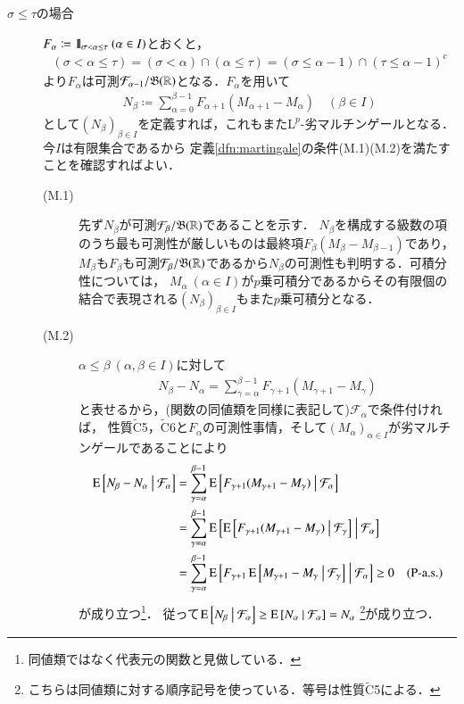 	\begin{prf}\mbox{}
		\begin{description}
			\item[$\sigma \leq \tau$の場合]
				$F_\alpha \coloneqq \mbox{1}\hspace{-0.25em}\mbox{l}_{\sigma < \alpha \leq \tau}\ (\alpha \in I)$とおくと，
				\begin{align}
					(\sigma < \alpha \leq \tau) = (\sigma < \alpha) \cap (\alpha \leq \tau) = (\sigma \leq \alpha-1) \cap (\tau \leq \alpha-1)^c
				\end{align}
				より$F_\alpha$は可測$\mathcal{F}_{\alpha-1}/\mathfrak{B}(\mathbb{R})$となる．$F_\alpha$を用いて
				\begin{align}
					N_\beta \coloneqq \sum_{\alpha=0}^{\beta-1} F_{\alpha+1}(M_{\alpha+1} - M_\alpha) \quad (\beta \in I)
				\end{align}
				として$(N_\beta)_{\beta \in I}$を定義すれば，これもまた$\mathrm{L}^p$-劣マルチンゲールとなる．今$I$は有限集合であるから
				定義\ref{dfn:martingale}の条件(M.1)(M.2)を満たすことを確認すればよい．
				\begin{description}
					\item[(M.1)] 先ず$N_\beta$が可測$\mathcal{F}_\beta/\mathfrak{B}(\mathbb{R})$であることを示す．
						$N_\beta$を構成する級数の項のうち最も可測性が厳しいものは最終項$F_{\beta}(M_{\beta} - M_{\beta-1})$であり，
						$M_\beta$も$F_{\beta}$も可測$\mathcal{F}_\beta/\mathfrak{B}(\mathbb{R})$であるから$N_\beta$の可測性も判明する．可積分性については，
						$M_\alpha\ (\alpha \in I)$が$p$乗可積分であるからその有限個の結合で表現される$(N_\beta)_{\beta \in I}$もまた$p$乗可積分となる．
					\item[(M.2)]	
						$\alpha \leq \beta\ (\alpha,\beta \in I)$に対して
						\begin{align}
							N_{\beta} - N_{\alpha} = \sum_{\gamma=\alpha}^{\beta-1} F_{\gamma+1}(M_{\gamma+1} - M_\gamma)
						\end{align}
						と表せるから，(関数の同値類を同様に表記して)$\mathcal{F}_{\alpha}$で条件付ければ，
						性質$\tilde{\mathrm{C}}$5，$\tilde{\mathrm{C}}$6と$F_\alpha$の可測性事情，そして$(M_\alpha)_{\alpha \in I}$が劣マルチンゲールであることにより
						\begin{align}
							\operatorname{E} \left[ N_{\beta} - N_{\alpha} \ \middle|\ \mathcal{F}_\alpha \right]
							&= \sum_{\gamma=\alpha}^{\beta-1} \operatorname{E} \left[ F_{\gamma+1}(M_{\gamma+1} - M_\gamma) \ \middle|\ \mathcal{F}_\alpha \right] \\
							&= \sum_{\gamma=\alpha}^{\beta-1} \operatorname{E} \left[ \operatorname{E} \left[ F_{\gamma+1}(M_{\gamma+1} - M_\gamma) \ \middle|\ \mathcal{F}_\gamma \right] \ \middle|\ \mathcal{F}_\alpha \right] \\
							&= \sum_{\gamma=\alpha}^{\beta-1} \operatorname{E} \left[ F_{\gamma+1}\operatorname{E} \left[ M_{\gamma+1} - M_\gamma \ \middle|\ \mathcal{F}_\gamma \right] \ \middle|\ \mathcal{F}_\alpha \right]
							\geq 0\quad (\mbox{P-a.s.})
						\end{align}
						が成り立つ\footnote{同値類ではなく代表元の関数と見做している．}．
						従って$\operatorname{E} \left[ N_{\beta} \ \middle|\ \mathcal{F}_\alpha \right] \geq \operatorname{E} \left[ N_{\alpha} \ \middle|\ \mathcal{F}_\alpha \right] = N_\alpha$
						\footnote{こちらは同値類に対する順序記号を使っている．等号は性質$\tilde{\mathrm{C}}$5による．}が成り立つ．
				\end{description}
				
		\end{description}
	\end{prf}
